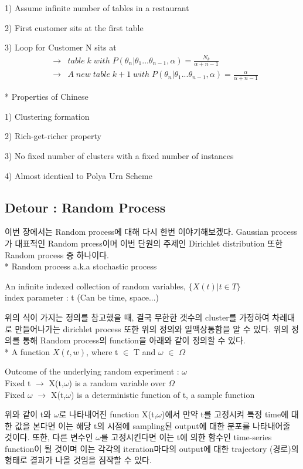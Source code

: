 \documentclass[a4paper]{oblivoir}
\begin{document}
1) Assume infinite number of tables in a restaurant

2) First customer sits at the first table

3) Loop for Customer N sits at
\begin{eqnarray}
&\rightarrow& table\; k\; with\; P(\theta_{n}|\theta_{1}...\theta_{n-1},\alpha) = \frac{N_{k}}{\alpha+n-1}\nonumber\\
&\rightarrow& A\; new \;table\; k+1\; with \; P(\theta_{n}|\theta_{1}...\theta_{n-1},\alpha) = \frac{\alpha}{\alpha+n-1}\nonumber
\end{eqnarray}

* Properties of Chinese

1) Clustering formation

2) Rich-get-richer property

3) No fixed number of clusters with a fixed number of instances

4) Almost identical to Polya Urn Scheme

\subsection{Detour : Random Process}
이번 장에서는 Random process에 대해 다시 한번 이야기해보겠다. Gaussian process가 대표적인 Random prcess이며 이번 단원의 주제인 Dirichlet distribution 또한 Random process 중 하나이다. \\

* Random process a.k.a stochastic process 
\begin{center}
    An infinite indexed collection of random variables, $\{X(t)|t \in T\}$\\
    index parameter : t (Can be time, space...)
\end{center}
위의 식이 가지는 정의를 참고했을 때, 결국 무한한 갯수의 cluster를 가정하여 차례대로 만들어나가는 dirichlet process 또한 위의 정의와 일맥상통함을 알 수 있다. 위의 정의를 통해 Random process의 function을 아래와 같이 정의할 수 있다.\\

* A function $X(t,w)$, where t $\in$ T and $\omega$ $\in$ $\Omega$
\begin{center}
    Outcome of the underlying random experiment : $\omega$\\
    Fixed t $\rightarrow$ X(t,$\omega$) is a random variable over $\Omega$\\
    Fixed $\omega$ $\rightarrow$ X(t,$\omega$) is a deterministic function of t, a sample function
\end{center}
위와 같이 t와 $\omega$로 나타내어진 function X(t,$\omega$)에서 만약 t를 고정시켜 특정 time에 대한 값을 본다면 이는 해당 t의 시점에 sampling된 output에 대한 분포를 나타내어줄 것이다. 또한, 다른 변수인 $\omega$를 고정시킨다면 이는 t에 의한 함수인 time-series function이 될 것이며  이는 각각의 iteration마다의 output에 대한 trajectory (경로)의 형태로 결과가 나올 것임을 짐작할 수 있다. 
\end{document}
